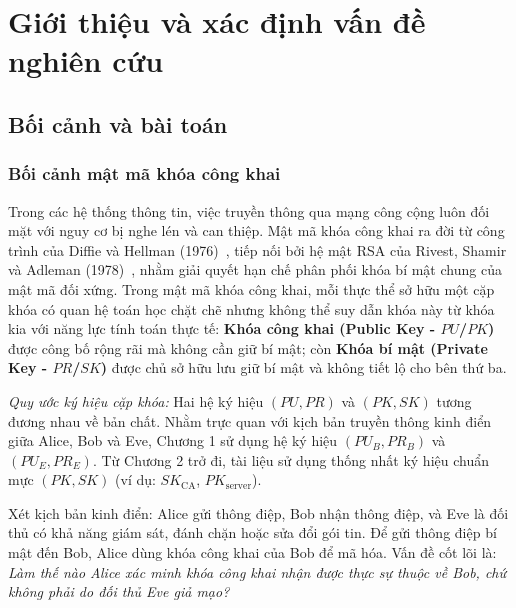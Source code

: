 \chapter{Giới thiệu và xác định vấn đề nghiên cứu}
\label{chap:gioi-thieu}

\section{Bối cảnh và bài toán}
\label{sec:context-problem}

\subsection{Bối cảnh mật mã khóa công khai}
Trong các hệ thống thông tin, việc truyền thông qua mạng công cộng luôn đối mặt với nguy cơ bị nghe lén và can thiệp. Mật mã khóa công khai ra đời từ công trình của Diffie và Hellman (1976)~\cite{diffie1976new}, tiếp nối bởi hệ mật RSA của Rivest, Shamir và Adleman (1978)~\cite{rsa1978}, nhằm giải quyết hạn chế phân phối khóa bí mật chung của mật mã đối xứng. Trong mật mã khóa công khai, mỗi thực thể sở hữu một cặp khóa có quan hệ toán học chặt chẽ nhưng không thể suy dẫn khóa này từ khóa kia với năng lực tính toán thực tế: \textbf{Khóa công khai (Public Key - $PU$/$PK$)} được công bố rộng rãi mà không cần giữ bí mật; còn \textbf{Khóa bí mật (Private Key - $PR$/$SK$)} được chủ sở hữu lưu giữ bí mật và không tiết lộ cho bên thứ ba.

\noindent\textit{Quy ước ký hiệu cặp khóa:} Hai hệ ký hiệu $(PU, PR)$ và $(PK, SK)$ tương đương nhau về bản chất. Nhằm trực quan với kịch bản truyền thông kinh điển giữa Alice, Bob và Eve, Chương 1 sử dụng hệ ký hiệu $(PU_B, PR_B)$ và $(PU_E, PR_E)$. Từ Chương 2 trở đi, tài liệu sử dụng thống nhất ký hiệu chuẩn mực $(PK, SK)$ (ví dụ: $SK_{\mathrm{CA}}$, $PK_{\mathrm{server}}$).

Xét kịch bản kinh điển: Alice gửi thông điệp, Bob nhận thông điệp, và Eve là đối thủ có khả năng giám sát, đánh chặn hoặc sửa đổi gói tin. Để gửi thông điệp bí mật đến Bob, Alice dùng khóa công khai của Bob để mã hóa. Vấn đề cốt lõi là: \textit{Làm thế nào Alice xác minh khóa công khai nhận được thực sự thuộc về Bob, chứ không phải do đối thủ Eve giả mạo?}

